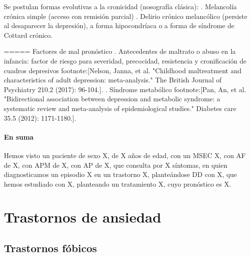\documentclass{scrbook}
\begin{document}
Se postulan formas evolutivas a la cronicidad (nosografía clásica):
. Melancolía crónica simple (acceso con remisión parcial)
. Delirio crónico melancólico (persiste al desaparecer la depresión), a forma hipocondríaca o a forma de síndrome de Cottard crónico.

===== Factores de mal pronóstico
. Antecedentes de maltrato o abuso en la infancia: factor de riesgo para severidad, precocidad, resistencia y cronificación de cuadros depresivos footnote:[Nelson, Janna, et al. "Childhood maltreatment and characteristics of adult depression: meta-analysis." The British Journal of Psychiatry 210.2 (2017): 96-104.].
. Síndrome metabólico footnote:[Pan, An, et al. "Bidirectional association between depression and metabolic syndrome: a systematic review and meta-analysis of epidemiological studies." Diabetes care 35.5 (2012): 1171-1180.].

\subsection*{En suma}

Hemos visto un paciente de sexo X, de X años de edad, con un MSEC X, con AF de X, con APM de X, con AP de X, que consulta por X síntomas, en quien diagnosticamos un episodio X en un trastorno X, planteándose DD con X, que hemos estudiado con X, planteando un tratamiento X, cuyo pronóstico es X.
\part{Trastornos de ansiedad}
\chapter*{Trastornos fóbicos}
\end{document}
